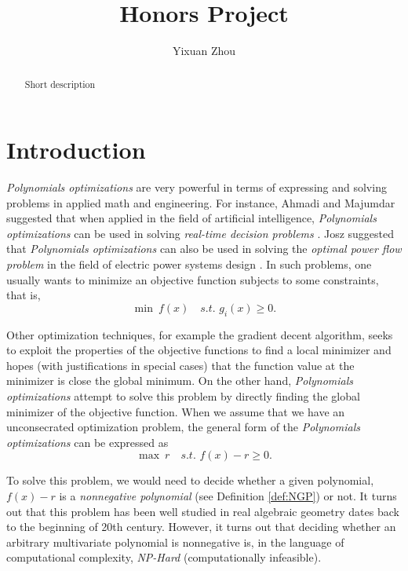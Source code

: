 \documentclass[12pt]{amsart}
\title{Honors Project}
\author{Yixuan Zhou} %
\numberwithin{equation}{section}
\theoremstyle{definition}
\numberwithin{thm}{section}
\begin{document}
 

\begin{abstract}
Short description
\end{abstract}

\maketitle


\section{Introduction} 

\emph{Polynomials optimizations} are very powerful in terms of expressing and solving problems in applied math and engineering. 
For instance, Ahmadi and Majumdar suggested that when applied in the field of artificial intelligence, \emph{Polynomials optimizations} can be used in solving \emph{real-time decision problems} \cite{ahmadi2015applications}.
Josz suggested that \emph{Polynomials optimizations} can also be used in solving the \emph{optimal power flow problem} in the field of electric power systems design \cite{josz:tel-01478431}. 
In such problems, one usually wants to minimize an objective function subjects to some constraints, that is,
\begin{equation*}
    \min \ f(x) \quad \textit{s.t. } g_i(x) \geq 0.
\end{equation*}

Other optimization techniques, for example the gradient decent algorithm, seeks to exploit the properties of the objective functions to find a local minimizer and hopes (with justifications in special cases) that the function value at the minimizer is close the global minimum. 
On the other hand, \emph{Polynomials optimizations} attempt to solve this problem by directly finding the global minimizer of the objective function. When we assume that we have an unconsecrated optimization problem, 
the general form of the \emph{Polynomials optimizations} can be expressed as
\begin{equation*}
     \max \ r \quad \textit{s.t. } f(x) - r \geq 0.
\end{equation*}

To solve this problem, we would need to decide whether a given polynomial, $f(x) - r$ is a \emph{nonnegative polynomial} (see Definition \ref{def:NGP}) or not.
It turns out that this problem has been well studied in real algebraic geometry dates back to the beginning of 20th century. 
However, it turns out that deciding whether an arbitrary multivariate polynomial is nonnegative is,
in the language of computational complexity, \emph{NP-Hard} (computationally infeasible). 
\end{document}

